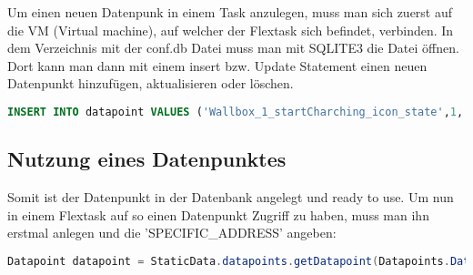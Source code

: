 Um einen neuen Datenpunk in einem Task anzulegen, muss man sich zuerst auf die VM (Virtual machine),  auf welcher der Flextask sich befindet, verbinden. In dem Verzeichnis mit der conf.db Datei muss man mit SQLITE3 die Datei öffnen. Dort kann man dann mit einem insert bzw. Update Statement einen neuen Datenpunkt hinzufügen, aktualisieren oder löschen.

\begin{lstlisting}[language=sql,caption=SQL Example,label=lst:impl:foo]
    INSERT INTO datapoint VALUES ('Wallbox_1_startCharching_icon_state',1,'' ,'state_[Wallbox_1_startCharching_icon]','','','INT',-1,-1,0.0,'');
\end{lstlisting}

\subsection{Nutzung eines Datenpunktes} 

Somit ist der Datenpunkt in der Datenbank angelegt und ready to use. Um nun in einem Flextask auf so einen Datenpunkt Zugriff zu haben, muss man ihn erstmal anlegen und die 'SPECIFIC\_ADDRESS' angeben:

\begin{lstlisting}[language=java,caption=Alengen eines Datenpunktes,label=lst:impl:foo]
    Datapoint datapoint = StaticData.datapoints.getDatapoint(Datapoints.DatapointField.SPECIFIC_ADDRESS, "SPECIFIC_ADDRESS_DES_DATENPUNKTES"); 
\end{lstlisting}

